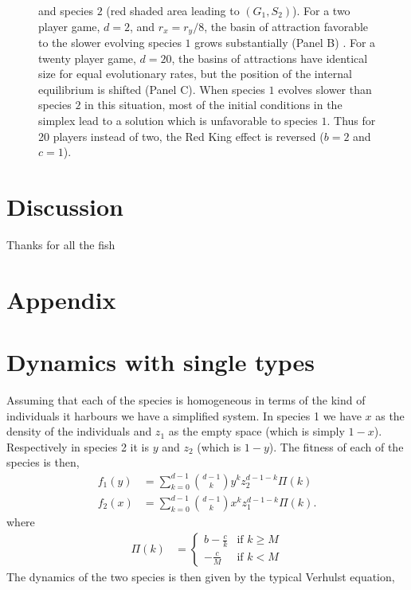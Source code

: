 \documentclass{pnastwo}
\begin{document}
\begin{article}
\begin{figure}[h]
\begin{center}
{and species $2$ (red shaded area leading to $(G_1, S_2)$).
For a two player game, $d=2$, and $r_x=r_y/8$, the basin of attraction favorable to the slower evolving species $1$ grows substantially (Panel B) \cite{bergstrom:2003jf}.
For a twenty player game, $d=20$, the basins of attractions have identical size for equal evolutionary rates, but the position of the internal equilibrium is shifted (Panel C).
When species $1$ evolves slower than species $2$ in this situation, most of the initial conditions in the simplex lead to a solution which is unfavorable to species $1$.
Thus for 20 players instead of two, the Red King effect is reversed ($b=2$ and $c=1$).
\label{fig:compare}
}
\end{center}
\end{figure}

\section{Discussion}




\begin{acknowledgments}
Thanks for all the fish
\end{acknowledgments}




\appendix

\section*{Appendix}

\section{Dynamics with single types}

Assuming that each of the species is homogeneous in terms of the kind of individuals it harbours we have a simplified system.
In species 1 we have $x$ as the density of the individuals and $z_1$ as the empty space (which is simply $1-x$).
Respectively in species 2 it is $y$ and $z_2$ (which is $1-y$).
The fitness of each of the species is then,
%
\begin{align}
f_{1} (y) &= \sum_{k=0}^{d-1} \binom{d-1}{k}y^k z_2 ^{d-1-k} \Pi(k) \\
f_{2} (x) &= \sum_{k=0}^{d-1} \binom{d-1}{k}x^k z_1 ^{d-1-k} \Pi(k).
\label{simpfiteqs}
\end{align}
%
where 
\begin{align}
\Pi (k) & = \begin{cases} b-\frac{c}{k} & \textrm{if } k \geq M \\  -\frac{c}{M} & \textrm{if } k < M 
\end{cases}	
\end{align}
The dynamics of the two species is then given by the typical Verhulst equation,


\end{article}
\end{document}
